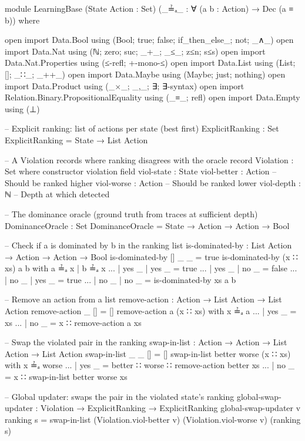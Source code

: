 \documentclass[9pt,a4paper]{article}
\theoremstyle{plain}
\theoremstyle{definition}
\theoremstyle{remark}
\begin{document}
\begin{code}[hide]
module LearningBase
  (State Action : Set)
  (_≟ₐ_ : ∀ (a b : Action) → Dec (a ≡ b))
  where

  open import Data.Bool using (Bool; true; false; if_then_else_; not; _∧_)
  open import Data.Nat using (ℕ; zero; suc; _+_; _≤_; z≤n; s≤s)
  open import Data.Nat.Properties using (≤-refl; +-mono-≤)
  open import Data.List using (List; []; _∷_; _++_)
  open import Data.Maybe using (Maybe; just; nothing)
  open import Data.Product using (_×_; _,_; ∃; ∃-syntax)
  open import Relation.Binary.PropositionalEquality using (_≡_; refl)
  open import Data.Empty using (⊥)

  -- Explicit ranking: list of actions per state (best first)
  ExplicitRanking : Set
  ExplicitRanking = State → List Action
\end{code}

\begin{code}
  -- A Violation records where ranking disagrees with the oracle
  record Violation : Set where
    constructor violation
    field
      viol-state  : State
      viol-better : Action  -- Should be ranked higher
      viol-worse  : Action  -- Should be ranked lower
      viol-depth  : ℕ       -- Depth at which detected

  -- The dominance oracle (ground truth from traces at sufficient depth)
  DominanceOracle : Set
  DominanceOracle = State → Action → Action → Bool
\end{code}

\begin{code}[hide]
  -- Check if a is dominated by b in the ranking list
  is-dominated-by : List Action → Action → Action → Bool
  is-dominated-by [] _ _ = true
  is-dominated-by (x ∷ xs) a b with a ≟ₐ x | b ≟ₐ x
  ... | yes _ | yes _ = true
  ... | yes _ | no  _ = false
  ... | no  _ | yes _ = true
  ... | no  _ | no  _ = is-dominated-by xs a b

  -- Remove an action from a list
  remove-action : Action → List Action → List Action
  remove-action _ [] = []
  remove-action a (x ∷ xs) with x ≟ₐ a
  ... | yes _ = xs
  ... | no  _ = x ∷ remove-action a xs
\end{code}

\begin{code}
  -- Swap the violated pair in the ranking
  swap-in-list : Action → Action → List Action → List Action
  swap-in-list _ _ [] = []
  swap-in-list better worse (x ∷ xs) with x ≟ₐ worse
  ... | yes _ = better ∷ worse ∷ remove-action better xs
  ... | no  _ = x ∷ swap-in-list better worse xs

  -- Global updater: swaps the pair in the violated state's ranking
  global-swap-updater : Violation → ExplicitRanking → ExplicitRanking
  global-swap-updater v ranking s = 
    swap-in-list (Violation.viol-better v) (Violation.viol-worse v) (ranking s)
\end{code}
\end{document}
